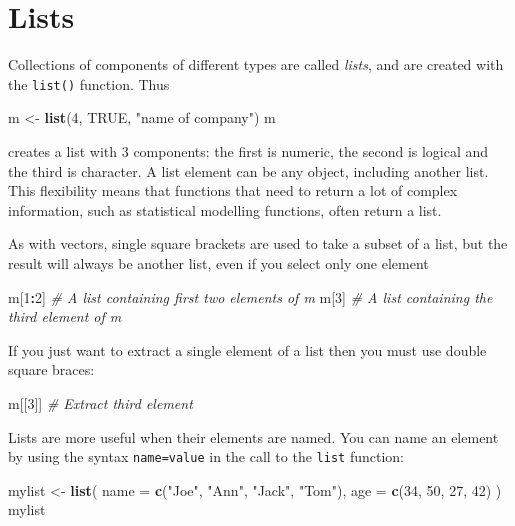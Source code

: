 \documentclass[
]{book}
\newenvironment{Shaded}{\begin{snugshade}}{\end{snugshade}}
\newcommand{\AttributeTok}[1]{\textcolor[rgb]{0.13,0.29,0.53}{#1}}
\newcommand{\CommentTok}[1]{\textcolor[rgb]{0.56,0.35,0.01}{\textit{#1}}}
\newcommand{\ConstantTok}[1]{\textcolor[rgb]{0.56,0.35,0.01}{#1}}
\newcommand{\DecValTok}[1]{\textcolor[rgb]{0.00,0.00,0.81}{#1}}
\newcommand{\FunctionTok}[1]{\textcolor[rgb]{0.13,0.29,0.53}{\textbf{#1}}}
\newcommand{\NormalTok}[1]{#1}
\newcommand{\OtherTok}[1]{\textcolor[rgb]{0.56,0.35,0.01}{#1}}
\newcommand{\SpecialCharTok}[1]{\textcolor[rgb]{0.81,0.36,0.00}{\textbf{#1}}}
\newcommand{\StringTok}[1]{\textcolor[rgb]{0.31,0.60,0.02}{#1}}
\begin{document}
\section{Lists}\label{lists}

Collections of components of different types are called \emph{lists},
and are created with the \texttt{list()} function. Thus

\begin{Shaded}
\begin{Highlighting}[]
\NormalTok{m }\OtherTok{\textless{}{-}} \FunctionTok{list}\NormalTok{(}\DecValTok{4}\NormalTok{, }\ConstantTok{TRUE}\NormalTok{, }\StringTok{"name of company"}\NormalTok{)}
\NormalTok{m}
\end{Highlighting}
\end{Shaded}

creates a list with 3 components: the first is numeric, the second
is logical and the third is character. A list element can be any
object, including another list. This flexibility means that functions
that need to return a lot of complex information, such as statistical
modelling functions, often return a list.

As with vectors, single square brackets are used to take a subset of a
list, but the result will always be another list, even if you select
only one element

\begin{Shaded}
\begin{Highlighting}[]
\NormalTok{m[}\DecValTok{1}\SpecialCharTok{:}\DecValTok{2}\NormalTok{] }\CommentTok{\# A list containing first two elements of m}
\NormalTok{m[}\DecValTok{3}\NormalTok{] }\CommentTok{\# A list containing the third element of m}
\end{Highlighting}
\end{Shaded}

If you just want to extract a single element of a list then you must use
double square braces:

\begin{Shaded}
\begin{Highlighting}[]
\NormalTok{m[[}\DecValTok{3}\NormalTok{]] }\CommentTok{\# Extract third element}
\end{Highlighting}
\end{Shaded}

Lists are more useful when their elements are named. You can name an element
by using the syntax \texttt{name=value} in the call to the \texttt{list} function:

\begin{Shaded}
\begin{Highlighting}[]
\NormalTok{mylist }\OtherTok{\textless{}{-}} \FunctionTok{list}\NormalTok{(}
  \AttributeTok{name =} \FunctionTok{c}\NormalTok{(}\StringTok{"Joe"}\NormalTok{, }\StringTok{"Ann"}\NormalTok{, }\StringTok{"Jack"}\NormalTok{, }\StringTok{"Tom"}\NormalTok{),}
  \AttributeTok{age =} \FunctionTok{c}\NormalTok{(}\DecValTok{34}\NormalTok{, }\DecValTok{50}\NormalTok{, }\DecValTok{27}\NormalTok{, }\DecValTok{42}\NormalTok{)}
\NormalTok{)}
\NormalTok{mylist}
\end{Highlighting}
\end{Shaded}
\end{document}
